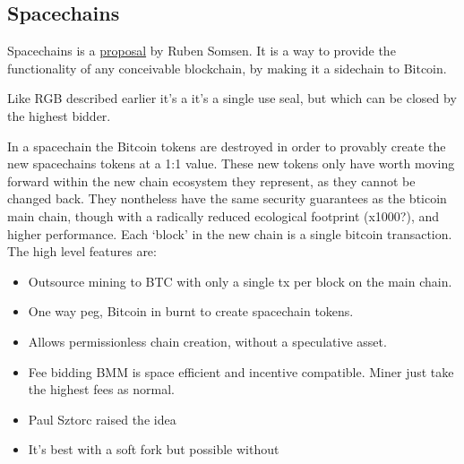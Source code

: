 \subsection{Spacechains}
Spacechains is a \href{https://medium.com/@RubenSomsen/21-million-bitcoins-to-rule-all-sidechains-the-perpetual-one-way-peg-96cb2f8ac302}{proposal} by Ruben Somsen. It is a way to provide the functionality of any conceivable blockchain, by making it a sidechain to Bitcoin. \par
Like RGB described earlier it's a it's a single use seal, but which can be closed by the highest bidder.\par
In a spacechain the Bitcoin tokens are destroyed in order to provably create the new spacechains tokens at a 1:1 value. These new tokens only have worth moving forward within the new chain ecosystem they represent, as they cannot be changed back. They nontheless have the same security guarantees as the bticoin main chain, though with a radically reduced ecological footprint (x1000?), and higher performance. Each `block' in the new chain is a single bitcoin transaction. The high level features are:\par
\begin{itemize}
\item Outsource mining to BTC with only a single tx per block on the main chain.
\item One way peg, Bitcoin in burnt to create spacechain tokens.
\item Allows permissionless chain creation, without a speculative asset.
\item Fee bidding BMM is space efficient and incentive compatible. Miner just take the highest fees as normal.
\item Paul Sztorc raised the idea
\item It's best with a soft fork but possible without
\end{itemize}

